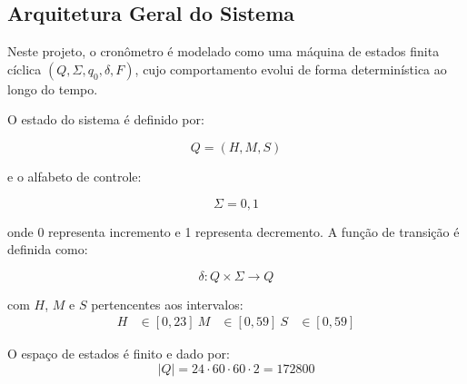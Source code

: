 \subsection{Arquitetura Geral do Sistema}

Neste projeto, o cronômetro é modelado como uma máquina de estados finita cíclica $(Q, \Sigma, q_0, \delta, F)$, cujo comportamento evolui de forma determinística ao longo do tempo.

O estado do sistema é definido por:

\[
Q = (H,M,S)
\]

e o alfabeto de controle:

\[
\Sigma = {0,1}
\]

onde 0 representa incremento e 1 representa decremento. A função de transição é definida como:

\[
\delta: Q \times \Sigma \rightarrow Q
\]

com $H$, $M$ e $S$ pertencentes aos intervalos:
\begin{align*}
H &\in [0, 23] \
M &\in [0, 59] \
S &\in [0, 59]
\end{align*}

O espaço de estados é finito e dado por:
\[
|Q| = 24 \cdot 60 \cdot 60 \cdot 2 = 172800
\]





